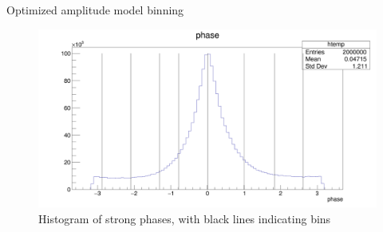 \documentclass{beamer}
\begin{document}
\begin{frame}{Optimized amplitude model binning}
  \begin{figure}
    \centering
    \includegraphics[width = 1.0\textwidth]{OptimizedAmplitudeStrongPhaseBins.png}
    \caption{Histogram of strong phases, with black lines indicating bins}
  \end{figure}
\end{frame}
\end{document}
